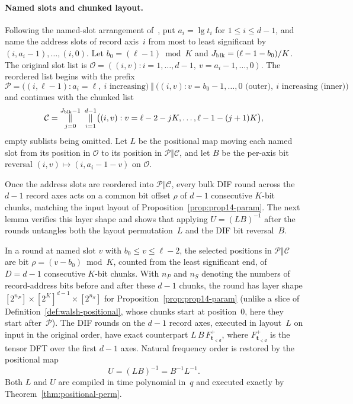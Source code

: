 \paragraph{Named slots and chunked layout.}
Following the named-slot arrangement of~\cite[Lemma~16]{OAI26}, put $a_i=\lg t_i$ for $1\le i\le d-1$, and name the
address slots of record axis~$i$ from most to least significant by $(i,a_i-1),\dots,(i,0)$. Let
$b_0=(\ell-1)\bmod K$ and $J_{\rm blk}=(\ell-1-b_0)/K$. The original slot list is
$\mathcal O=((i,v):i=1,\dots,d-1,\ v=a_i-1,\dots,0)$. The reordered list begins with the prefix
\[
  \mathcal P=\bigl((i,\ell-1):a_i=\ell,\ i\text{ increasing}\bigr)\ \Vert\
  \bigl((i,v):v=b_0-1,\dots,0\text{ (outer)},\ i\text{ increasing (inner)}\bigr)
\]
and continues with the chunked list
\[
  \mathcal C=\mathop{\Vert}_{j=0}^{J_{\rm blk}-1}\ \mathop{\Vert}_{i=1}^{d-1}
  \bigl((i,v):v=\ell-2-jK,\dots,\ell-1-(j+1)K\bigr),
\]
empty sublists being omitted. Let $L$ be the positional map moving each named slot from its position in $\mathcal O$ to
its position in $\mathcal P\Vert\mathcal C$, and let $B$ be the per-axis bit reversal $(i,v)\mapsto(i,a_i-1-v)$ on
$\mathcal O$.

Once the address slots are reordered into $\mathcal P\Vert\mathcal C$, every bulk DIF round across the $d-1$ record axes
acts on a common bit offset $\rho$ of $d-1$ consecutive $K$-bit chunks, matching the input layout of
Proposition~\ref{prop:prop14-param}. The next lemma verifies this layer shape and shows that applying $U=(LB)^{-1}$
after the rounds untangles both the layout permutation~$L$ and the DIF bit reversal~$B$.

\begin{lemma}\label{lem:walsh-layout}
In a round at named slot $v$ with $b_0\le v\le\ell-2$, the selected positions in $\mathcal P\Vert\mathcal C$ are bit
$\rho=(v-b_0)\bmod K$, counted from the least significant end, of $D=d-1$ consecutive $K$-bit chunks. With $n_P$ and
$n_S$ denoting the numbers of record-address bits before and after these $d-1$ chunks, the round has layer shape
$[2^{n_P}]\times[2^K]^{d-1}\times[2^{n_S}]$ for Proposition~\ref{prop:prop14-param} (unlike a slice of
Definition~\ref{def:walsh-positional}, whose chunks start at position~$0$, here they start after~$\mathcal P$). The DIF
rounds on the $d-1$ record axes, executed in layout~$L$ on input in the original order, have exact counterpart
$L\,B\,F^+_{\mathbf t_{<d}}$, where $F^+_{\mathbf t_{<d}}$ is the tensor DFT over the first $d-1$ axes. Natural
frequency order is restored by the positional map
\begin{equation}\label{eq:unshuffle}
  U=(LB)^{-1}=B^{-1}L^{-1}.
\end{equation}
Both $L$ and $U$ are compiled in time polynomial in~$q$ and executed exactly by Theorem~\ref{thm:positional-perm}.
\end{lemma}

